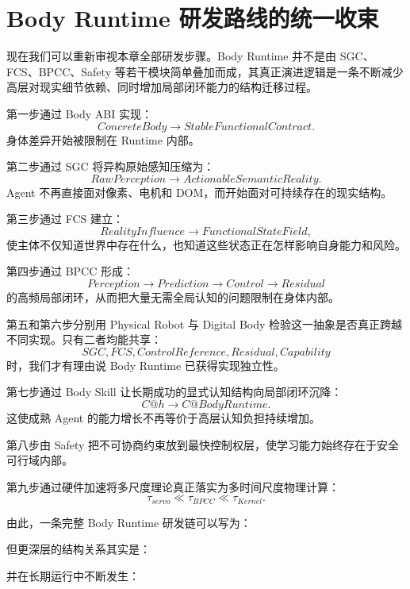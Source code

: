 \section{Body Runtime 研发路线的统一收束}

现在我们可以重新审视本章全部研发步骤。Body Runtime 并不是由 SGC、FCS、BPCC、Safety 等若干模块简单叠加而成，其真正演进逻辑是一条不断减少高层对现实细节依赖、同时增加局部闭环能力的结构迁移过程。

第一步通过 Body ABI 实现：
\[
ConcreteBody
\rightarrow
StableFunctionalContract.
\]
身体差异开始被限制在 Runtime 内部。

第二步通过 SGC 将异构原始感知压缩为：
\[
RawPerception
\rightarrow
ActionableSemanticReality.
\]
Agent 不再直接面对像素、电机和 DOM，而开始面对可持续存在的现实结构。

第三步通过 FCS 建立：
\[
RealityInfluence
\rightarrow
FunctionalStateField,
\]
使主体不仅知道世界中存在什么，也知道这些状态正在怎样影响自身能力和风险。

第四步通过 BPCC 形成：
\[
Perception
\rightarrow
Prediction
\rightarrow
Control
\rightarrow
Residual
\]
的高频局部闭环，从而把大量无需全局认知的问题限制在身体内部。

第五和第六步分别用 Physical Robot 与 Digital Body 检验这一抽象是否真正跨越不同实现。只有二者均能共享：
\[
SGC,
FCS,
ControlReference,
Residual,
Capability
\]
时，我们才有理由说 Body Runtime 已获得实现独立性。

第七步通过 Body Skill 让长期成功的显式认知结构向局部闭环沉降：
\[
C@h
\rightarrow
C@BodyRuntime.
\]
这使成熟 Agent 的能力增长不再等价于高层认知负担持续增加。

第八步由 Safety 把不可协商约束放到最快控制权层，使学习能力始终存在于安全可行域内部。

第九步通过硬件加速将多尺度理论真正落实为多时间尺度物理计算：
\[
\tau_{servo}
\ll
\tau_{BPCC}
\ll
\tau_{Kernel}.
\]

由此，一条完整 Body Runtime 研发链可以写为：
\begin{statementbox}
\centering
{}
\end{statementbox}

但更深层的结构关系其实是：
\begin{statementbox}
\centering
{}
\end{statementbox}
并在长期运行中不断发生：
\begin{statementbox}
\centering
{}
\end{statementbox}


